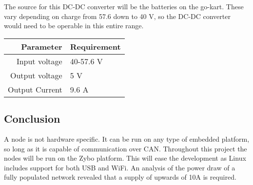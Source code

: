 The source for this DC-DC converter will be the batteries on the go-kart. 
These vary depending on charge from 57.6 down to 40 V, so the DC-DC converter would need to be operable in this entire range.


\begin{table}[H]
	\centering
	\begin{tabular}{r|l}
		Parameter & Requirement  \\
		\hline
		Input voltage & 40-57.6 V\\
		Output voltage & 5 V\\
		Output Current & 9.6 A
	\end{tabular}
\end{table}


\subsection{Conclusion}
A node is not hardware specific.
It can be run on any type of embedded platform, so long as it is capable of communication over CAN.
Throughout this project the nodes will be run on the Zybo platform.
This will ease the development as Linux includes support for both USB and WiFi.
An analysis of the power draw of a fully populated network revealed that a supply of upwards of 10\si{\ampere} is required.
